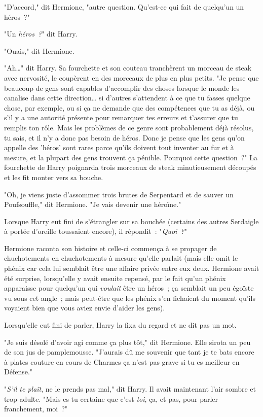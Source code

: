 "D'accord," dit Hermione, "autre question. Qu'est-ce qui fait de quelqu'un un héros~?"

"Un \emph{héros~?}" dit Harry.

"Ouais," dit Hermione.

"Ah…" dit Harry. Sa fourchette et son couteau tranchèrent un morceau de steak avec nervosité, le coupèrent en des morceaux de plus en plus petits. "Je pense que beaucoup de gens sont capables d'accomplir des choses lorsque le monde les canalise dans cette direction… si d'autres s'attendent à ce que tu fasses quelque chose, par exemple, ou si ça ne demande que des compétences que tu as déjà, ou s'il y a une autorité présente pour remarquer tes erreurs et t'assurer que tu remplis ton rôle. Mais les problèmes de ce genre sont probablement déjà résolus, tu sais, et il n'y a donc pas besoin de héros. Donc je pense que les gens qu'on appelle des 'héros' sont rares parce qu'ils doivent tout inventer au fur et à mesure, et la plupart des gens trouvent ça pénible. Pourquoi cette question~?" La fourchette de Harry poignarda trois morceaux de steak minutieusement découpés et les fit monter vers sa bouche.

"Oh, je viens juste d'assommer trois brutes de Serpentard et de sauver un Poufsouffle," dit Hermione. "Je vais devenir une héroïne."

Lorsque Harry eut fini de s'étrangler sur sa bouchée (certains des autres Serdaigle à portée d'oreille toussaient encore), il répondit~: "\emph{Quoi~?}"

Hermione raconta son histoire et celle-ci commença à se propager de chuchotements en chuchotements à mesure qu'elle parlait (mais elle omit le phénix car cela lui semblait être une affaire privée entre eux deux. Hermione avait été surprise, lorsqu'elle y avait ensuite repensé, par le fait qu'un phénix apparaisse pour quelqu'un qui \emph{voulait} être un héros~; ça semblait un peu égoïste vu sous cet angle~; mais peut-être que les phénix s'en fichaient du moment qu'ils voyaient bien que vous aviez envie d'aider les gens).

Lorsqu'elle eut fini de parler, Harry la fixa du regard et ne dit pas un mot.

"Je suis désolé d'avoir agi comme ça plus tôt," dit Hermione. Elle sirota un peu de son jus de pamplemousse. "J'aurais dû me souvenir que tant je te bats encore à plates couture en cours de Charmes ça n'est pas grave si tu es meilleur en Défense."

"\emph{S'il te plaît}, ne le prends pas mal," dit Harry. Il avait maintenant l'air sombre et trop-adulte. "Mais es-tu certaine que c'est \emph{toi}, ça, et pas, pour parler franchement, moi~?"

